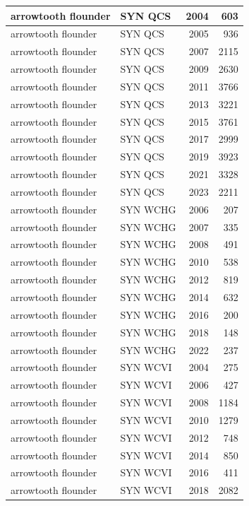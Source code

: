 \documentclass[
  letterpaper,
  DIV=11,
  numbers=noendperiod]{scrartcl}
\begin{document}
\begin{tabular}[t]{l|l|r|r}
\hline
arrowtooth flounder & SYN QCS & 2004 & 603\\
\hline
arrowtooth flounder & SYN QCS & 2005 & 936\\
\hline
arrowtooth flounder & SYN QCS & 2007 & 2115\\
\hline
arrowtooth flounder & SYN QCS & 2009 & 2630\\
\hline
arrowtooth flounder & SYN QCS & 2011 & 3766\\
\hline
arrowtooth flounder & SYN QCS & 2013 & 3221\\
\hline
arrowtooth flounder & SYN QCS & 2015 & 3761\\
\hline
arrowtooth flounder & SYN QCS & 2017 & 2999\\
\hline
arrowtooth flounder & SYN QCS & 2019 & 3923\\
\hline
arrowtooth flounder & SYN QCS & 2021 & 3328\\
\hline
arrowtooth flounder & SYN QCS & 2023 & 2211\\
\hline
arrowtooth flounder & SYN WCHG & 2006 & 207\\
\hline
arrowtooth flounder & SYN WCHG & 2007 & 335\\
\hline
arrowtooth flounder & SYN WCHG & 2008 & 491\\
\hline
arrowtooth flounder & SYN WCHG & 2010 & 538\\
\hline
arrowtooth flounder & SYN WCHG & 2012 & 819\\
\hline
arrowtooth flounder & SYN WCHG & 2014 & 632\\
\hline
arrowtooth flounder & SYN WCHG & 2016 & 200\\
\hline
arrowtooth flounder & SYN WCHG & 2018 & 148\\
\hline
arrowtooth flounder & SYN WCHG & 2022 & 237\\
\hline
arrowtooth flounder & SYN WCVI & 2004 & 275\\
\hline
arrowtooth flounder & SYN WCVI & 2006 & 427\\
\hline
arrowtooth flounder & SYN WCVI & 2008 & 1184\\
\hline
arrowtooth flounder & SYN WCVI & 2010 & 1279\\
\hline
arrowtooth flounder & SYN WCVI & 2012 & 748\\
\hline
arrowtooth flounder & SYN WCVI & 2014 & 850\\
\hline
arrowtooth flounder & SYN WCVI & 2016 & 411\\
\hline
arrowtooth flounder & SYN WCVI & 2018 & 2082\\

\end{tabular}
\end{document}
